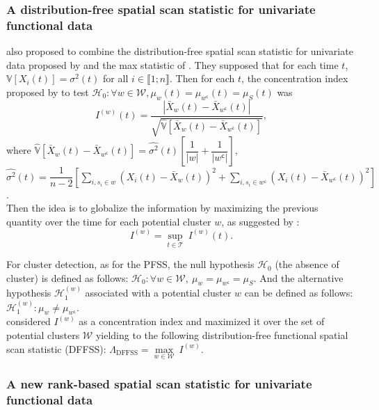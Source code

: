 \subsubsection{A distribution-free spatial scan statistic for univariate functional data}

\citet{notre_fonctionnel} also proposed to combine the distribution-free spatial scan statistic for univariate data proposed by \citet{a_distribution_free} and the max statistic of \citet{hd_manova}. They supposed that for each time $t$, $\mathbb{V}[X_i(t)] = \sigma^2(t)$ for all $i \in \llbracket 1 ; n \rrbracket$. Then for each $t$, the concentration index proposed by \citet{a_distribution_free} to test $\mathcal{H}_0: \forall w \in \mathcal{W}, \mu_w(t) = \mu_{w^\mathsf{c}}(t) = \mu_S(t)$ was 
$$I^{(w)}(t) = \dfrac{|\bar{X}_w(t) - \bar{X}_{w^\mathsf{c}}(t)|}{\sqrt{\hat{\mathbb{V}}[\bar{X}_w(t) - \bar{X}_{w^\mathsf{c}}(t)]}}, $$
where $\hat{\mathbb{V}}[\bar{X}_w(t) - \bar{X}_{w^\mathsf{c}}(t)] = \widehat{\sigma^2}(t) \left[ \dfrac{1}{|w|} + \dfrac{1}{|w^\mathsf{c}|} \right] $, \\ $\displaystyle{\widehat{\sigma^2}(t) = \dfrac{1}{n-2} \left[ \sum_{i, s_i \in w} (X_i(t) - \bar{X}_w(t))^2 + \sum_{i, s_i \in w^\mathsf{c}} (X_i(t) - \bar{X}_{w^\mathsf{c}}(t))^2 \right]}$. \\

\noindent Then the idea is to globalize the information by maximizing the previous quantity over the time for each potential cluster $w$, as suggested by \citet{hd_manova}:
$$ I^{(w)} = \underset{t \in \mathcal{T}}{\sup} \ I^{(w)}(t).$$

\noindent For cluster detection, as for the PFSS, the null hypothesis $\mathcal{H}_0$ (the absence of cluster) is defined as follows: $\mathcal{H}_0: \forall w \in \mathcal{W}, \ \mu_{w} = \mu_{w^\mathsf{c}} = \mu_S$. And the alternative hypothesis $\mathcal{H}_1^{(w)}$ associated with a potential cluster $w$ can be defined as follows: $\mathcal{H}_1^{(w)}: \mu_{w} \neq \mu_{w^\mathsf{c}}$. \\

\noindent \citet{notre_fonctionnel} considered $I^{(w)}$ as a concentration index and maximized it over the set of potential clusters $\mathcal{W}$ yielding to the following distribution-free functional spatial scan statistic (DFFSS): $
\Lambda_{\text{DFFSS}} = \underset{w \in \mathcal{W}}{\max} \  I^{(w)}$.



\subsubsection{A new rank-based spatial scan statistic for univariate functional data}

